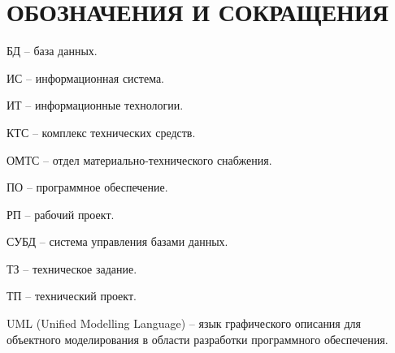 \newsection
\section*{ОБОЗНАЧЕНИЯ И СОКРАЩЕНИЯ}

БД – база данных.

ИС – информационная система.

ИТ – информационные технологии. 

КТС – комплекс технических средств.

ОМТС – отдел материально-технического снабжения. 

ПО – программное обеспечение.

РП – рабочий проект.

СУБД – система управления базами данных.

ТЗ – техническое задание.

ТП – технический проект.

UML (Unified Modelling Language) – язык графического описания для объектного моделирования в области разработки программного обеспечения.
